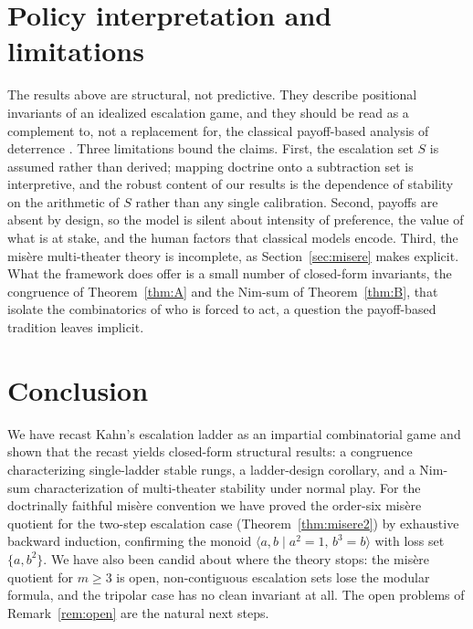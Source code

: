 \documentclass[11pt]{article}
\theoremstyle{plain}
\theoremstyle{definition}
\theoremstyle{remark}
\begin{document}
\section{Policy interpretation and limitations}\label{sec:policy}

The results above are structural, not predictive. They describe positional
invariants of an idealized escalation game, and they should be read as a
complement to, not a replacement for, the classical payoff-based analysis of
deterrence \citep{powell1990, brams1985}. Three limitations bound the claims.
First, the escalation set $S$ is assumed rather than derived; mapping doctrine
onto a subtraction set is interpretive, and the robust content of our results
is the dependence of stability on the arithmetic of $S$ rather than any single
calibration. Second, payoffs are absent by design, so the model is silent
about intensity of preference, the value of what is at stake, and the human
factors that classical models encode. Third, the mis\`ere multi-theater
theory is incomplete, as Section~\ref{sec:misere} makes explicit. What the
framework does offer is a small number of closed-form invariants, the
congruence of Theorem~\ref{thm:A} and the Nim-sum of Theorem~\ref{thm:B},
that isolate the combinatorics of who is forced to act, a question the
payoff-based tradition leaves implicit.

\section{Conclusion}\label{sec:conclusion}

We have recast Kahn's escalation ladder as an impartial combinatorial game
and shown that the recast yields closed-form structural results: a congruence
characterizing single-ladder stable rungs, a ladder-design corollary, and a
Nim-sum characterization of multi-theater stability under normal play. For the
doctrinally faithful mis\`ere convention we have proved the order-six
mis\`ere quotient for the two-step escalation case (Theorem~\ref{thm:misere2})
by exhaustive backward induction, confirming the monoid
$\langle a,b\mid a^2=1,\,b^3=b\rangle$ with loss set $\{a,b^2\}$. We have
also been candid about where the theory stops: the mis\`ere quotient for
$m\ge 3$ is open, non-contiguous escalation sets lose the modular formula,
and the tripolar case has no clean invariant at all. The open problems of
Remark~\ref{rem:open} are the natural next steps.
\end{document}
